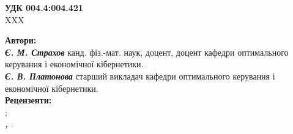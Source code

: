 \begin{titlepage}
	
	\pagebreak
	
	\large
	\raggedright \Large {\textbf{УДК 004.4:004.421 }\\
		\hspace*{1 cm} XXX}
	
	\bigskip
	
	\large
	\hspace{1cm}\textbf{Автори:}\\
	\textbf{\textit{Є. М. Страхов}} канд. фіз.-мат. наук, доцент, доцент кафедри оптимального керування і економічної кібернетики.\\ 
	\textbf{\textit{Є. В. Платонова}} старший викладач кафедри оптимального керування і економічної кібернетики.\\ 
	\medskip
	\hspace{1cm}\textbf{Рецензенти:}\\
	\textbf{\textit{ }} ;\\
	\textbf{\textit{,}} .
	
	
	
	\bigskip
	\medskip
	

\end{titlepage}

